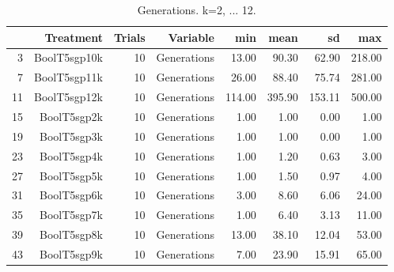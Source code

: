 \begin{table}[ht]
\centering
\begin{tabular}{rrrrrrrr}
  \hline
 & Treatment & Trials & Variable & min & mean & sd & max \\ 
  \hline
3 & BoolT5sgp10k &  10 & Generations & 13.00 & 90.30 & 62.90 & 218.00 \\ 
  7 & BoolT5sgp11k &  10 & Generations & 26.00 & 88.40 & 75.74 & 281.00 \\ 
  11 & BoolT5sgp12k &  10 & Generations & 114.00 & 395.90 & 153.11 & 500.00 \\ 
  15 & BoolT5sgp2k &  10 & Generations & 1.00 & 1.00 & 0.00 & 1.00 \\ 
  19 & BoolT5sgp3k &  10 & Generations & 1.00 & 1.00 & 0.00 & 1.00 \\ 
  23 & BoolT5sgp4k &  10 & Generations & 1.00 & 1.20 & 0.63 & 3.00 \\ 
  27 & BoolT5sgp5k &  10 & Generations & 1.00 & 1.50 & 0.97 & 4.00 \\ 
  31 & BoolT5sgp6k &  10 & Generations & 3.00 & 8.60 & 6.06 & 24.00 \\ 
  35 & BoolT5sgp7k &  10 & Generations & 1.00 & 6.40 & 3.13 & 11.00 \\ 
  39 & BoolT5sgp8k &  10 & Generations & 13.00 & 38.10 & 12.04 & 53.00 \\ 
  43 & BoolT5sgp9k &  10 & Generations & 7.00 & 23.90 & 15.91 & 65.00 \\ 
   \hline
\end{tabular}
\caption{Generations. k=2, ... 12.} 
\end{table}

